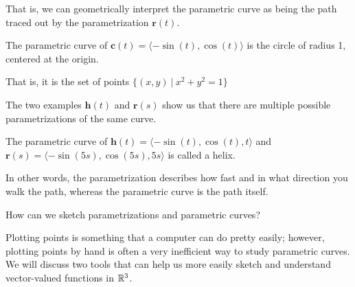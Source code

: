 That is, we can geometrically interpret the parametric curve as being the path traced out by the parametrization $\bm{r}(t)$.  

\begin{example}
The parametric curve of $\bm{c}(t) = \langle  -\sin(t), \cos(t) \rangle$ is the circle of radius 1, centered at the origin.

That is, it is the set of points $\{(x,y) \ | \ x^2 + y^2=1 \}$
\end{example}


\begin{remark}
The two examples \hyperref[helix1]{$\bm{h}(t)$} and \hyperref[helix2]{$\bm{r}(s)$} show us that there are multiple possible parametrizations of the same curve.
\end{remark}

\begin{example}
The parametric curve of $\bm{h}(t) = \langle -\sin(t), \cos(t), t \rangle$ and $\bm{r}(s) = \langle -\sin(5s), \cos(5s), 5s \rangle$ is called a helix.

\begin{center}
    \end{center}

\end{example}


In other words, the parametrization describes how fast and in what direction you walk the path, whereas the parametric curve is the path itself.

\begin{motivating}
How can we sketch parametrizations and parametric curves?
\end{motivating}

Plotting points is something that a computer can do pretty easily; however, plotting points by hand is often a very inefficient way to study parametric curves.  We will discuss two tools that can help us more easily sketch and understand vector-valued functions in $\mathbb{R}^3$.

